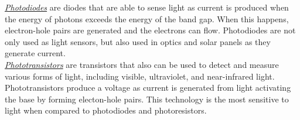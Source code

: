 \noindent \underline{\textit{Photodiodes}} are diodes that are able to sense light as current is produced when the energy of photons exceeds the energy of the band gap. When this happens, electron-hole pairs are generated and the electrons can flow. Photodiodes are not only used as light sensors, but also used in optics and solar panels as they generate current.
\cite{byjus2024} \cite{analog2024}\\

\noindent \underline{\textit{Phototransistors}} are transistors that also can be used to detect and measure various forms of light, including visible, ultraviolet, and near-infrared light. Phototransistors produce a voltage as current is generated from light activating the base by forming electon-hole pairs. This technology is the most sensitive to light when compared to photodiodes and photoresistors. \cite{globalspec2024} \cite{analog2024}\\